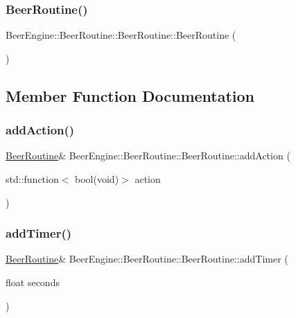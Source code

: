 \subsubsection{\texorpdfstring{Beer\+Routine()}{BeerRoutine()}}
{\footnotesize\ttfamily Beer\+Engine\+::\+Beer\+Routine\+::\+Beer\+Routine\+::\+Beer\+Routine (\begin{DoxyParamCaption}{ }\end{DoxyParamCaption})}



\subsection{Member Function Documentation}
\mbox{\label{class_beer_engine_1_1_beer_routine_1_1_beer_routine_abd6b5782ae6bc5f951d4df91f700fdc3}} 
\subsubsection{\texorpdfstring{add\+Action()}{addAction()}}
{\footnotesize\ttfamily \mbox{\hyperlink{class_beer_engine_1_1_beer_routine_1_1_beer_routine}{Beer\+Routine}}\& Beer\+Engine\+::\+Beer\+Routine\+::\+Beer\+Routine\+::add\+Action (\begin{DoxyParamCaption}\item[{std\+::function$<$ bool(void)$>$}]{action }\end{DoxyParamCaption})}

\mbox{\label{class_beer_engine_1_1_beer_routine_1_1_beer_routine_a174692c444eca2b7e6ba55389bc73f0b}} 
\subsubsection{\texorpdfstring{add\+Timer()}{addTimer()}}
{\footnotesize\ttfamily \mbox{\hyperlink{class_beer_engine_1_1_beer_routine_1_1_beer_routine}{Beer\+Routine}}\& Beer\+Engine\+::\+Beer\+Routine\+::\+Beer\+Routine\+::add\+Timer (\begin{DoxyParamCaption}\item[{float}]{seconds }\end{DoxyParamCaption})}

